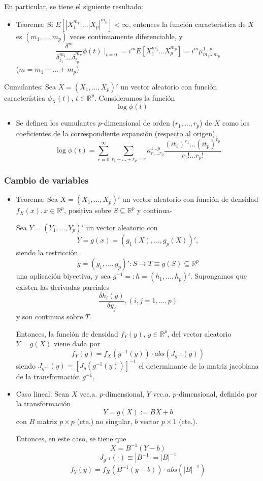 \documentclass[11pt,a4paper]{article}
\begin{document}
En particular, se tiene el siguiente resultado:
\begin{itemize}
\item Teorema: Si $E[|X_{1}^{m_{1}}| \dots |X_{p}|^{m_{p}}] < \infty$, entonces la función característica de $X$ es $(m_{1}, \dots, m_{p})$ veces continuamente diferenciable, y
$$\frac{\delta^{m}}{\delta_{t_{1}}^{m_{1}} \dots \delta_{t_{p}}^{m_{p}}} \phi(t) \mid_{t=0} = i^{m}E[X_{1}^{m_{1}} \dots X_{p}^{m_{p}}] = i^{m} \mu_{m_{1} \dots m_{p}}^{1 \dots p}$$
($m = m_{1} + \dots + m_{p}$)
\end{itemize}

Cumulantes: Sea $X = (X_{1}, \dots, X_{p})'$ un vector aleatorio con función característica $\phi_{X}(t)$, $t \in \mathbb{R}^{p}$. Consideramos la función
$$\log \phi(t)$$
\begin{itemize}
\item Se definen los cumulantes $p$-dimensional de orden ($r_{1}, \dots, r_{p}$) de $X$ como los coeficientes de la correspondiente expansión (respecto al origen),
$$\log \phi(t) = \sum_{r=0}^{\infty} \sum_{r_{1} + \dots + r_{p} = r} \kappa_{r_{1} \dots r_{p}}^{1 \dots p} \frac{(it_{1})^{r_{1}} \dots (it_{p})^{r_{p}}}{r_{1}! \dots r_{p}!}$$
\end{itemize}

\subsubsection{Cambio de variables}
\begin{itemize}
\item Teorema: Sea $X = (X_{1}, \dots, X_{p})'$ un vector aleatorio con función de densidad $f_{X}(x), x \in \mathbb{R}^{p}$, positiva sobre $S \subseteq \mathbb{R}^{p}$ y continua-

Sea $Y = (Y_{1}, \dots, Y_{p})'$ un vector aleatorio con
$$Y = g(x) = (g_{1}(X), \dots, g_{p}(X))',$$
siendo la restricción
$$g = (g_{1}, \dots, g_{p})': S \to T \equiv g(S) \subseteq \mathbb{R}^{p}$$
una aplicación biyectiva, y sea $g^{-1} =: h = (h_{1}, \dots, h_{p})'$. Supongamos que existen las derivadas parciales
$$\frac{\delta h_{i} (y)}{\delta y_{j}}, (i, j = 1, \dots, p)$$
y son continuas sobre $T$.

Entonces, la función de densidad $f_{Y}(y)$, $y \in \mathbb{R}^{p}$, del vector aleatorio $Y = g(X)$ viene dada por
$$f_{Y}(y) = f_{X}(g^{-1}(y)) \cdot abs(J_{g^{-1}}(y))$$
siendo $J_{g^{-1}}(y) = [J_{g}(g^{-1}(y))]^{-1}$ el determinante de la matriz jacobiana de la transformación $g^{-1}$.

\item Caso lineal: Sean $X$ vec.a. $p$-dimensional, $Y$ vec.a. $p$-dimensional, definido por la transformación
$$Y = g(X) := BX + b$$
con $B$ matriz $p \times p$ (cte.) no singular, $b$ vector $p \times 1$ (cte.).

Entonces, en este caso, se tiene que
$$X = B^{-1}(Y - b)$$
$$J_{g^{-1}}(\cdot) \equiv |B^{-1}| = |B|^{-1}$$
$$f_{Y}(y) = f_{X}(B^{-1}(y-b)) \cdot abs(|B|^{-1})$$
\end{itemize}
\end{document}
